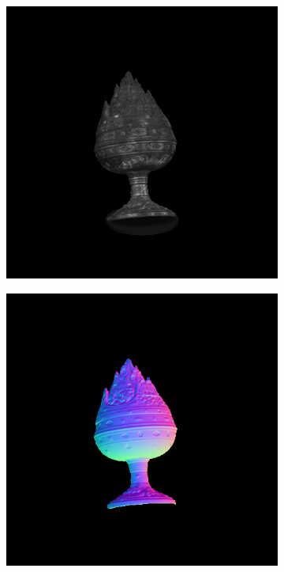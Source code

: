 \documentclass[border=15pt, multi, tikz]{article}
\begin{document}
\begin{figure}[H]
\begin{subfigure}[b]{0.20\linewidth}
	\end{subfigure}
	\begin{subfigure}[b]{0.20\linewidth}
		\includegraphics[width=\linewidth]{./Figures/test_scenes/05051.image0.png}
	\end{subfigure}
	\begin{subfigure}[b]{0.20\linewidth}
		\includegraphics[width=\linewidth]{./Figures/test_scenes/05051.normal0.png}
	\end{subfigure}
	

\end{figure}
\end{document}
